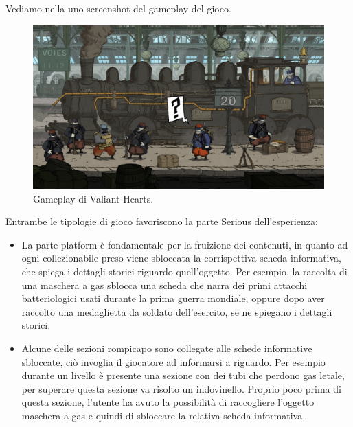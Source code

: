 Vediamo nella \myfig{\ref{fig:vhgameplay}} uno screenshot del gameplay del gioco. 

\begin{figure}[h]
\centerline{\includegraphics[scale=0.17]{images/statoarte/vhgameplay.jpg}}
\caption{Gameplay di Valiant Hearts.}
\label{fig:vhgameplay}
\end{figure}

Entrambe le tipologie di gioco favoriscono la parte Serious dell'esperienza:

\begin{itemize}
\item La parte platform è fondamentale per la fruizione dei contenuti, in quanto ad ogni collezionabile preso viene sbloccata la corrispettiva scheda informativa, che spiega i dettagli storici riguardo quell'oggetto. Per esempio, la raccolta di una maschera a gas sblocca una scheda che narra dei primi attacchi batteriologici usati durante la prima guerra mondiale, oppure dopo aver raccolto una medaglietta da soldato dell'esercito, se ne spiegano i dettagli storici.
\item Alcune delle sezioni rompicapo sono collegate alle schede informative sbloccate, ciò invoglia il giocatore ad informarsi a riguardo. Per esempio durante un livello è presente una sezione con dei tubi che perdono gas letale, per superare questa sezione va risolto un indovinello. Proprio poco prima di questa sezione, l'utente ha avuto la possibilità di raccogliere l'oggetto maschera a gas e quindi di sbloccare la relativa scheda informativa.
\end{itemize}


